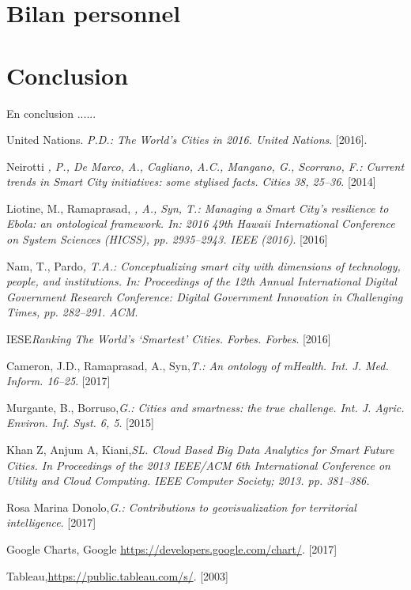 \documentclass[french, a4paper, 12pt]{report}
\begin{document}
\section{Bilan personnel}
\section{Conclusion}
En conclusion ...... 

% 
%  
{} 
\begin{thebibliography}{9}
United Nations. \emph{P.D.: The World’s Cities in 2016. United Nations}. [2016].

 Neirotti \emph{, P., De Marco, A., Cagliano, A.C., Mangano, G., Scorrano, F.: Current trends in Smart City initiatives: some stylised facts. Cities 38, 25–36}. [2014]


  Liotine, M., Ramaprasad, \emph{, A., Syn, T.: Managing a Smart City’s resilience to Ebola: an ontological framework. In: 2016 49th Hawaii International Conference on System Sciences (HICSS), pp. 2935–2943. IEEE (2016)}. [2016]

 Nam, T., Pardo\emph{, T.A.: Conceptualizing smart city with dimensions of technology, people, and institutions. In: Proceedings of the 12th Annual International Digital Government Research Conference: Digital Government Innovation in Challenging Times, pp. 282–291. ACM}.

IESE\emph{Ranking The World’s ‘Smartest’ Cities. Forbes. Forbes}. [2016]

Cameron, J.D., Ramaprasad, A., Syn,\emph{T.: An ontology of mHealth. Int. J. Med. Inform. 16–25}. [2017]

 Murgante, B., Borruso,\emph{G.: Cities and smartness: the true challenge. Int. J. Agric. Environ. Inf. Syst. 6, 5}. [2015]

Khan Z, Anjum A, Kiani,\emph{SL. Cloud Based Big Data Analytics for Smart Future Cities. In Proceedings of the 2013 IEEE/ACM 6th International Conference on Utility and Cloud Computing. IEEE Computer Society; 2013. pp. 381–386.}

 Rosa Marina Donolo,\emph{G.: Contributions to geovisualization for territorial
intelligence}. [2017]

 Google Charts, Google \url{https://developers.google.com/chart/}. [2017]

 Tableau,\url{https://public.tableau.com/s/}. [2003]

\end{thebibliography}
\end{document}

